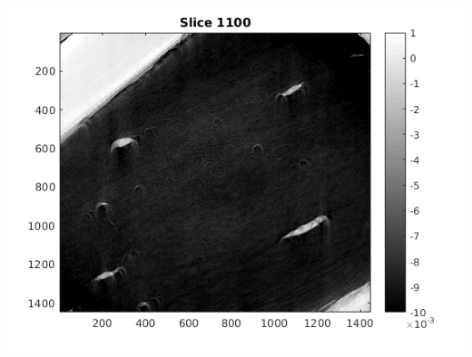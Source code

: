 \documentclass[10pt,a4paper,titlepage]{article}
\begin{document}
        \includegraphics[width=\textwidth]{no0pad/slice1100.png}
\end{document}
